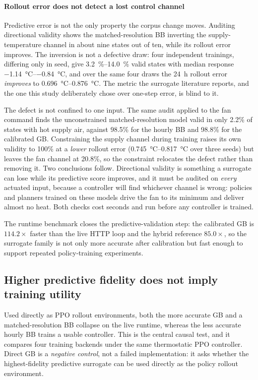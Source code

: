 \paragraph{Rollout error does not detect a lost control channel}
Predictive error is not the only property the corpus change moves. Auditing directional validity
shows the matched-resolution BB inverting the supply-temperature channel in about nine states out of
ten, while its rollout error improves. The inversion is not a defective draw: four independent
trainings, differing only in seed, give \SIrange{3.2}{14.0}{\percent} valid states with median
response \SIrange{-1.14}{-0.84}{\celsius}, and over the same four draws the 24~h rollout error
\emph{improves} to \SIrange{0.696}{0.876}{\celsius}. The metric the surrogate literature reports,
and the one this study deliberately chose over one-step error, is blind to it.

The defect is not confined to one input. The same audit applied to the fan command finds the
unconstrained matched-resolution model valid in only 2.2\% of states with hot supply air, against
98.5\% for the hourly BB and 98.8\% for the calibrated GB. Constraining the supply channel during
training raises its own validity to 100\% at a \emph{lower} rollout error
(\SIrange{0.745}{0.817}{\celsius} over three seeds) but leaves the fan channel at 20.8\%, so the
constraint relocates the defect rather than removing it. Two conclusions follow. Directional
validity is something a surrogate can lose while its predictive score improves, and it must be
audited on \emph{every} actuated input, because a controller will find whichever channel is wrong:
policies and planners trained on these models drive the fan to its minimum and deliver almost no
heat. Both checks cost seconds and run before any controller is trained.

The runtime benchmark closes the predictive-validation step: the calibrated GB is $114.2\times$
faster than the live HTTP loop and the hybrid reference $85.0\times$, so the surrogate family is not
only more accurate after calibration but fast enough to support repeated policy-training
experiments.

\subsection{Higher predictive fidelity does not imply training utility}\label{sec:paradox}

Used directly as PPO rollout environments, both the more accurate GB and a matched-resolution BB
collapse on the live runtime, whereas the less accurate hourly BB trains a usable controller. This
is the central causal test, and it compares four training backends under the same thermostatic PPO
controller. Direct GB is a \emph{negative control}, not a failed implementation: it asks whether the
highest-fidelity predictive surrogate can be used directly as the policy rollout environment.

